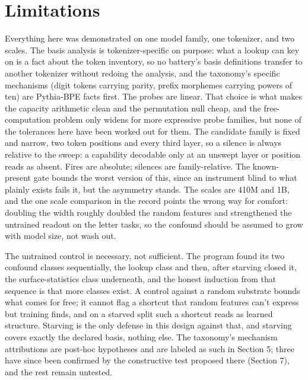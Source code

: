 \section{Limitations}\label{limitations}

Everything here was demonstrated on one model family, one tokenizer,
and two scales. The basis analysis is tokenizer-specific on purpose:
what a lookup can key on is a fact about the token inventory, so no
battery's basis definitions transfer to another tokenizer without
redoing the analysis, and the taxonomy's specific mechanisms (digit
tokens carrying parity, prefix morphemes carrying powers of ten) are
Pythia-BPE facts first. The probes are linear. That choice is what
makes the capacity arithmetic clean and the permutation null cheap, and
the free-computation problem only widens for more expressive probe
families, but none of the tolerances here have been worked out for
them. The candidate family is fixed and narrow, two token positions
and every third layer, so a silence is always relative to the sweep: a
capability decodable only at an unswept layer or position reads as
absent. Fires are absolute; silences are family-relative. The
known-present gate bounds the worst version of this, since an
instrument blind to what plainly exists fails it, but the asymmetry
stands. The scales are 410M and 1B, and the one scale comparison in the
record points the wrong way for comfort: doubling the width roughly
doubled the random features and strengthened the untrained readout on
the letter tasks, so the confound should be assumed to grow with model
size, not wash out.

The untrained control is necessary, not sufficient. The program found
its two confound classes sequentially, the lookup class and then, after
starving closed it, the surface-statistics class underneath, and the
honest induction from that sequence is that more classes exist. A
control against a random substrate bounds what comes for free; it
cannot flag a shortcut that random features can't express but training
finds, and on a starved split such a shortcut reads as learned
structure. Starving is the only defense in this design against that,
and starving covers exactly the declared basis, nothing else. The
taxonomy's mechanism attributions are post-hoc hypotheses and are
labeled as such in Section 5; three have since been confirmed by the
constructive test proposed there (Section 7), and the rest remain
untested.

